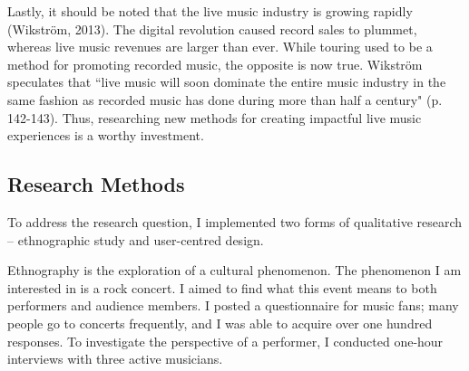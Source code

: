 Lastly, it should be noted that the live music industry is growing rapidly (Wikstr\"{o}m, 2013). The digital revolution caused record sales to plummet, whereas live music revenues are larger than ever. While touring used to be a method for promoting recorded music, the opposite is now true. Wikstr\"{o}m speculates that ``live music will soon dominate the entire music industry in the same fashion as recorded music has done during more than half a century" (p. 142-143). Thus, researching new methods for creating impactful live music experiences is a worthy investment.

\subsection{Research Methods}

To address the research question, I implemented two forms of qualitative research -- ethnographic study and user-centred design.

Ethnography is the exploration of a cultural phenomenon. The phenomenon I am interested in is a rock concert. I aimed to find what this event means to both performers and audience members. I posted a questionnaire for music fans; many people go to concerts frequently, and I was able to acquire over one hundred responses. To investigate the perspective of a performer, I conducted one-hour interviews with three active musicians.

